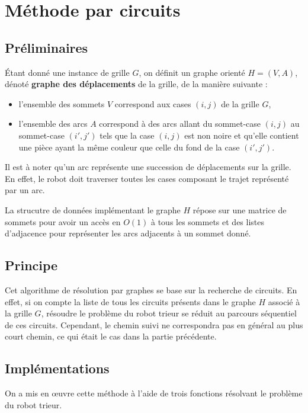 \documentclass[12pt,a4paper]{article}
\begin{document}
\section{M\'ethode par circuits}
\subsection*{Pr\'eliminaires}
\'Etant donn\'e une instance de grille $G$, on d\'efinit un graphe orient\'e $H = (V,A)$, d\'enot\'e {\bfseries graphe des d\'eplacements} de la grille, de la mani\`ere suivante :
\begin{itemize}
\item l'ensemble des sommets $V$ correspond aux cases $(i,j)$ de la grille $G$,
\item l'ensemble des arcs $A$ correspond \`a des arcs allant du sommet-case $(i,j)$ au sommet-case $(i',j')$ tels que la case $(i,j)$ est non noire et qu'elle contient une pi\`ece ayant la m\^eme couleur que celle du fond de la case $(i',j')$.
\end{itemize}

Il est \`a noter qu'un arc repr\'esente une succession de d\'eplacements sur la grille. En effet, le robot doit traverser toutes les cases composant le trajet repr\'esent\'e par un arc.

La strucutre de donn\'ees impl\'ementant le graphe $H$ r\'epose sur une matrice de sommets pour avoir un acc\`es en $O(1)$ \`a tous les sommets et des listes d'adjacence pour repr\'esenter les arcs adjacents \`a un sommet donn\'e. 

\subsection*{Principe}
Cet algorithme de r\'esolution par graphes se base sur la recherche de circuits. En effet, si on compte la liste de tous les circuits pr\'esents dans le graphe $H$ associ\'e \`a la grille $G$, r\'esoudre le probl\`eme du robot trieur se r\'eduit au parcours s\'equentiel de ces circuits. Cependant, le chemin suivi ne correspondra pas en g\'en\'eral au plus court chemin, ce qui \'etait le cas dans la partie pr\'ec\'edente.

\subsection*{Impl\'ementations}
On a mis en \oe uvre cette m\'ethode \`a l'aide de trois fonctions r\'esolvant le probl\`eme du robot trieur.
\end{document}
